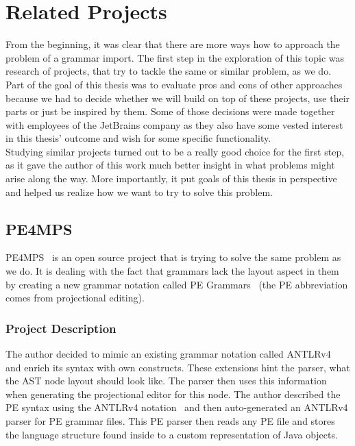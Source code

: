 \chapter{Related Projects}
\label{chap:related_projects}

From the beginning, it was clear that there are more ways how to approach the problem of a grammar import.
The first step in the exploration of this topic was research of projects, that try to tackle the same or similar problem, as we do.
Part of the goal of this thesis was to evaluate pros and cons of other approaches because we had to decide whether we will build on top of these projects, use their parts or just be inspired by them.
Some of those decisions were made together with employees of the JetBrains company as they also have some vested interest in this thesis' outcome and wish for some specific functionality.
\\

Studying similar projects turned out to be a really good choice for the first step, as it gave the author of this work much better insight in what problems might arise along the way.
More importantly, it put goals of this thesis in perspective and helped us realize how we want to try to solve this problem.

\section{PE4MPS}
\label{chap:pe4mps}
PE4MPS~\cite{PE4MPS} is an open source project that is trying to solve the same problem as we do.
It is dealing with the fact that grammars lack the layout aspect in them by creating a new grammar notation called PE Grammars~\cite{PE} (the PE abbreviation comes from projectional editing).

\subsection{Project Description}
The author decided to mimic an existing grammar notation called ANTLRv4~\cite{ANTLR4} and enrich its syntax with own constructs.
These extensions hint the parser, what the AST node layout should look like.
The parser then uses this information when generating the projectional editor for this node.
The author described the PE syntax using the ANTLRv4 notation~\cite{ANTLR4reference} and then auto-generated an ANTLRv4 parser for PE grammar files.
This PE parser then reads any PE file and stores the language structure found inside to a custom representation of Java objects.
\\

